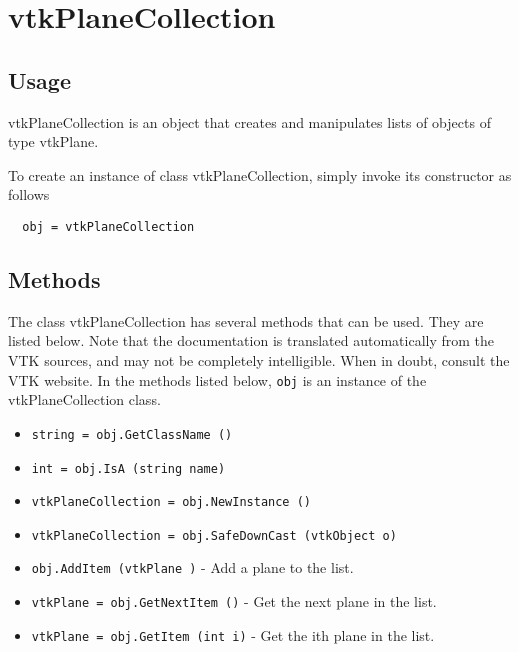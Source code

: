 \section{vtkPlaneCollection}

\subsection{Usage}

 vtkPlaneCollection is an object that creates and manipulates
 lists of objects of type vtkPlane. 

To create an instance of class vtkPlaneCollection, simply
invoke its constructor as follows
\begin{verbatim}
  obj = vtkPlaneCollection
\end{verbatim}
\subsection{Methods}

The class vtkPlaneCollection has several methods that can be used.
  They are listed below.
Note that the documentation is translated automatically from the VTK sources,
and may not be completely intelligible.  When in doubt, consult the VTK website.
In the methods listed below, \verb|obj| is an instance of the vtkPlaneCollection class.
\begin{itemize}
\item  \verb|string = obj.GetClassName ()|

\item  \verb|int = obj.IsA (string name)|

\item  \verb|vtkPlaneCollection = obj.NewInstance ()|

\item  \verb|vtkPlaneCollection = obj.SafeDownCast (vtkObject o)|

\item  \verb|obj.AddItem (vtkPlane )| -  Add a plane to the list.

\item  \verb|vtkPlane = obj.GetNextItem ()| -  Get the next plane in the list.

\item  \verb|vtkPlane = obj.GetItem (int i)| -  Get the ith plane in the list.

\end{itemize}
